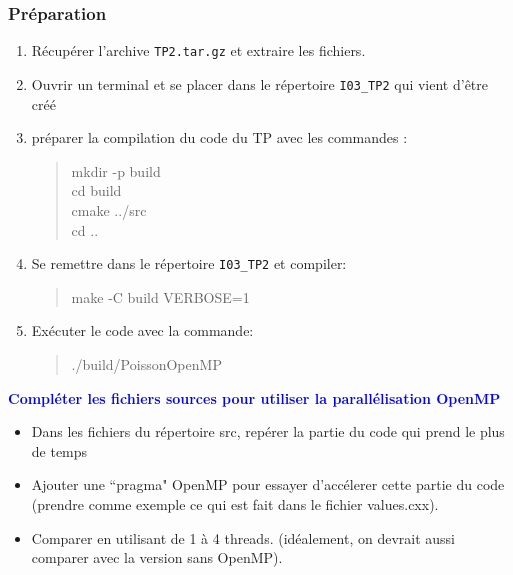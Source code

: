 \documentclass{beamer}
\begin{document}
\begin{frame}
\frametitle{Pr\'eparation}

\vfill
\begin{enumerate}
	\item R\'ecup\'erer l'archive {\tt TP2.tar.gz} et extraire les fichiers.
	\item Ouvrir un terminal et se placer dans le r\'epertoire {\tt I03\_TP2} \break qui vient d'\^etre cr\'e\'e
	\item préparer la compilation du code du TP avec les commandes :
	\begin{quote}
		mkdir -p build\\
		cd build\\
		cmake ../src\\
		cd ..
	\end{quote}
	\item Se remettre dans le r\'epertoire {\tt I03\_TP2} et compiler:
	\begin{quote}
		make -C build VERBOSE=1
	\end{quote}
\end{enumerate}
\vfill	
\end{frame}

\begin{frame}
	\begin{enumerate}
		\setcounter{enumi}{4}
		\item Ex\'ecuter le code avec la commande:
		\begin{quote}
			./build/PoissonOpenMP
		\end{quote}
	\end{enumerate}
\end{frame}

\begin{frame}
	\textcolor{blue}{\bf Compl\'eter les fichiers sources pour utiliser la parall\'elisation OpenMP}
	
	\begin{itemize}
		\item Dans les fichiers du r\'epertoire src, rep\'erer la partie du code qui prend le plus de temps
		\item Ajouter une ``pragma" OpenMP pour essayer d'acc\'elerer cette partie du code (prendre comme exemple ce qui est fait dans le fichier values.cxx).
		\item Comparer en utilisant de 1 \`a 4 threads. (id\'ealement, on devrait aussi comparer avec la version sans OpenMP). 
	\end{itemize}
\end{frame}
\end{document}
